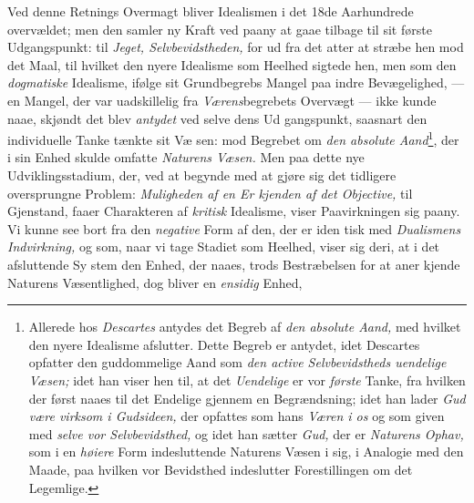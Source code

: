 Ved denne Retnings Overmagt bliver Idealismen i det
18de Aarhundrede overvældet; men den samler ny Kraft ved
paany at gaae tilbage til sit første Udgangspunkt: til \emph{Jeget,
Selvbevidstheden,} for ud fra det atter at stræbe hen
mod det Maal, til hvilket den nyere Idealisme som Heelhed
sigtede hen, men som den \emph{dogmatiske} Idealisme, ifølge sit
Grundbegrebs Mangel paa indre Bevægelighed, --- en Mangel,
der var uadskillelig fra \emph{Værens}begrebets Overvægt --- ikke
kunde naae, skjøndt det blev \emph{antydet} ved selve dens Ud\-%
gangspunkt, saasnart den individuelle Tanke tænkte sit Væ\-%
sen: mod Begrebet om \emph{den absolute Aand}\footnote{Allerede hos \emph{Descartes} antydes det Begreb af \emph{den absolute
Aand,} med hvilket den nyere Idealisme afslutter. Dette Begreb
er antydet, idet Descartes opfatter den guddommelige Aand som
\emph{den active Selvbevidstheds uendelige Væsen;} idet han
viser hen til, at det \emph{Uendelige} er vor \emph{første} Tanke, fra hvilken
der først naaes til det Endelige gjennem en Begrændsning; idet
han lader \emph{Gud være virksom i Gudsideen,} der opfattes som
hans \emph{Væren i os} og som given med \emph{selve vor Selvbevidsthed,}
og idet han sætter \emph{Gud,} der er \emph{Naturens Ophav,} som i en
\emph{høiere} Form indesluttende Naturens Væsen i sig, i Analogie med
den Maade, paa hvilken vor Bevidsthed indeslutter Forestillingen
om det Legemlige.}, der i sin
Enhed skulde omfatte \emph{Naturens Væsen.} Men paa dette nye
Udviklingsstadium, der, ved at begynde med at gjøre sig det
tidligere oversprungne Problem: \emph{Muligheden af en Er\-%
kjenden af det Objective,} til Gjenstand, faaer Charakteren
af \emph{kritisk} Idealisme, viser Paavirkningen sig paany. Vi
kunne see bort fra den \emph{negative} Form af den, der er iden\-%
tisk med \emph{Dualismens Indvirkning,} og som, naar vi tage
Stadiet som Heelhed, viser sig deri, at i det afsluttende Sy\-%
stem den Enhed, der naaes, trods Bestræbelsen for at aner\-%
kjende Naturens Væsentlighed, dog bliver en \emph{ensidig} Enhed,
